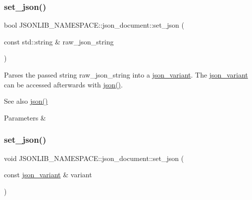 \subsubsection{\texorpdfstring{set\+\_\+json()}{set\_json()}\hspace{0.1cm}{\footnotesize\ttfamily [1/4]}}
{\footnotesize\ttfamily bool J\+S\+O\+N\+L\+I\+B\+\_\+\+N\+A\+M\+E\+S\+P\+A\+C\+E\+::json\+\_\+document\+::set\+\_\+json (\begin{DoxyParamCaption}\item[{const std\+::string \&}]{raw\+\_\+json\+\_\+string }\end{DoxyParamCaption})}



Parses the passed string {\ttfamily raw\+\_\+json\+\_\+string} into a \hyperlink{classJSONLIB__NAMESPACE_1_1json__variant}{json\+\_\+variant}. The \hyperlink{classJSONLIB__NAMESPACE_1_1json__variant}{json\+\_\+variant} can be accessed afterwards with \hyperlink{classJSONLIB__NAMESPACE_1_1json__document_ad87b8e7d68ba854dbd730758273a3b93}{json()}. 

\begin{DoxySeeAlso}{See also}
\hyperlink{classJSONLIB__NAMESPACE_1_1json__document_ad87b8e7d68ba854dbd730758273a3b93}{json()} 
\end{DoxySeeAlso}

\begin{DoxyParams}{Parameters}
{\em } & \\
\hline
\end{DoxyParams}
\mbox{\label{classJSONLIB__NAMESPACE_1_1json__document_ae6c52de0f1b1b6e5825f9555b6026e1b}} 
\subsubsection{\texorpdfstring{set\+\_\+json()}{set\_json()}\hspace{0.1cm}{\footnotesize\ttfamily [2/4]}}
{\footnotesize\ttfamily void J\+S\+O\+N\+L\+I\+B\+\_\+\+N\+A\+M\+E\+S\+P\+A\+C\+E\+::json\+\_\+document\+::set\+\_\+json (\begin{DoxyParamCaption}\item[{const \hyperlink{classJSONLIB__NAMESPACE_1_1json__variant}{json\+\_\+variant} \&}]{variant }\end{DoxyParamCaption})}



